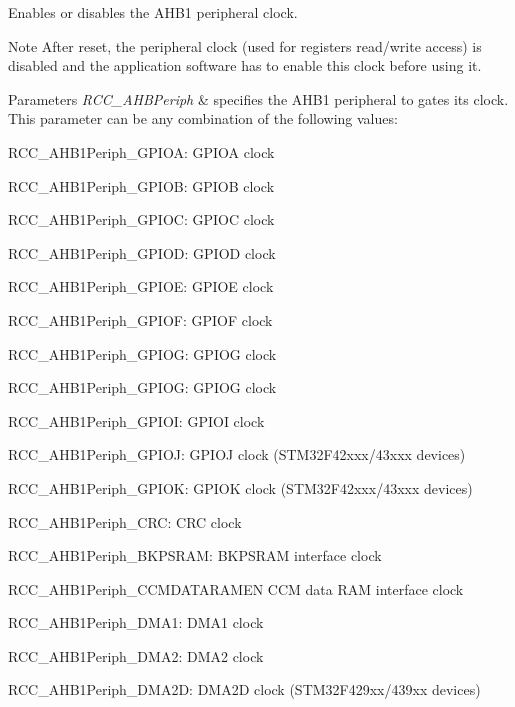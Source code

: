 Enables or disables the A\+H\+B1 peripheral clock. 

\begin{DoxyNote}{Note}
After reset, the peripheral clock (used for registers read/write access) is disabled and the application software has to enable this clock before using it. ~\newline

\end{DoxyNote}

\begin{DoxyParams}{Parameters}
{\em R\+C\+C\+\_\+\+A\+H\+B\+Periph} & specifies the A\+H\+B1 peripheral to gates its clock. This parameter can be any combination of the following values\+: \begin{DoxyItemize}
\item R\+C\+C\+\_\+\+A\+H\+B1\+Periph\+\_\+\+G\+P\+I\+OA\+: G\+P\+I\+OA clock \item R\+C\+C\+\_\+\+A\+H\+B1\+Periph\+\_\+\+G\+P\+I\+OB\+: G\+P\+I\+OB clock \item R\+C\+C\+\_\+\+A\+H\+B1\+Periph\+\_\+\+G\+P\+I\+OC\+: G\+P\+I\+OC clock \item R\+C\+C\+\_\+\+A\+H\+B1\+Periph\+\_\+\+G\+P\+I\+OD\+: G\+P\+I\+OD clock \item R\+C\+C\+\_\+\+A\+H\+B1\+Periph\+\_\+\+G\+P\+I\+OE\+: G\+P\+I\+OE clock \item R\+C\+C\+\_\+\+A\+H\+B1\+Periph\+\_\+\+G\+P\+I\+OF\+: G\+P\+I\+OF clock \item R\+C\+C\+\_\+\+A\+H\+B1\+Periph\+\_\+\+G\+P\+I\+OG\+: G\+P\+I\+OG clock \item R\+C\+C\+\_\+\+A\+H\+B1\+Periph\+\_\+\+G\+P\+I\+OG\+: G\+P\+I\+OG clock \item R\+C\+C\+\_\+\+A\+H\+B1\+Periph\+\_\+\+G\+P\+I\+OI\+: G\+P\+I\+OI clock \item R\+C\+C\+\_\+\+A\+H\+B1\+Periph\+\_\+\+G\+P\+I\+OJ\+: G\+P\+I\+OJ clock (S\+T\+M32\+F42xxx/43xxx devices) \item R\+C\+C\+\_\+\+A\+H\+B1\+Periph\+\_\+\+G\+P\+I\+OK\+: G\+P\+I\+OK clock (S\+T\+M32\+F42xxx/43xxx devices) ~\newline
 \item R\+C\+C\+\_\+\+A\+H\+B1\+Periph\+\_\+\+C\+RC\+: C\+RC clock \item R\+C\+C\+\_\+\+A\+H\+B1\+Periph\+\_\+\+B\+K\+P\+S\+R\+AM\+: B\+K\+P\+S\+R\+AM interface clock \item R\+C\+C\+\_\+\+A\+H\+B1\+Periph\+\_\+\+C\+C\+M\+D\+A\+T\+A\+R\+A\+M\+EN C\+CM data R\+AM interface clock \item R\+C\+C\+\_\+\+A\+H\+B1\+Periph\+\_\+\+D\+M\+A1\+: D\+M\+A1 clock \item R\+C\+C\+\_\+\+A\+H\+B1\+Periph\+\_\+\+D\+M\+A2\+: D\+M\+A2 clock \item R\+C\+C\+\_\+\+A\+H\+B1\+Periph\+\_\+\+D\+M\+A2D\+: D\+M\+A2D clock (S\+T\+M32\+F429xx/439xx devices) ~\newline

\end{DoxyItemize}
\end{DoxyParams}
